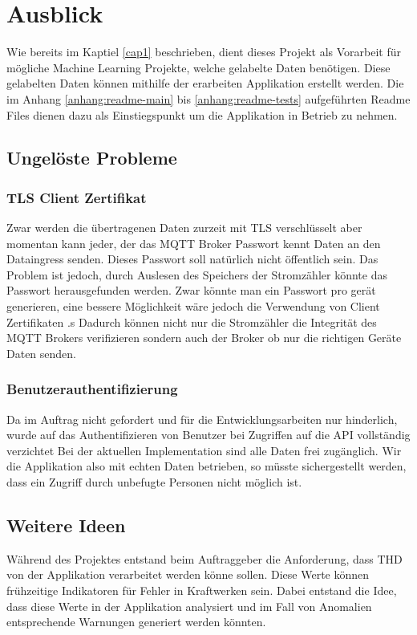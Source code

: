 \chapter{Ausblick}
Wie bereits im Kaptiel \ref{cap1} beschrieben, dient dieses Projekt als Vorarbeit für mögliche
Machine Learning Projekte, welche gelabelte Daten benötigen.
Diese gelabelten Daten können mithilfe der erarbeiten Applikation erstellt werden.
Die im Anhang \ref{anhang:readme-main} bis \ref{anhang:readme-tests} aufgeführten Readme Files dienen dazu als Einstiegspunkt
um die Applikation in Betrieb zu nehmen.



\section{Ungelöste Probleme}

\subsection{\ac{TLS} Client Zertifikat}

Zwar werden die übertragenen Daten zurzeit mit \ac{TLS} verschlüsselt aber
momentan kann jeder, der das \ac{MQTT} Broker Passwort kennt Daten an den
Dataingress senden. Dieses Passwort soll natürlich nicht öffentlich sein.
Das Problem ist jedoch, durch Auslesen des Speichers der Stromzähler
könnte das Passwort herausgefunden werden.
Zwar könnte man ein Passwort pro gerät generieren, eine bessere Möglichkeit
wäre jedoch die Verwendung von Client Zertifikaten \parencite{rfc5246_2021}.s
Dadurch können nicht nur die Stromzähler die Integrität des \ac{MQTT} Brokers
verifizieren sondern auch der Broker ob nur die richtigen Geräte
Daten senden.

\subsection{Benutzerauthentifizierung}
Da im Auftrag nicht gefordert und für die Entwicklungsarbeiten nur hinderlich,
wurde auf das Authentifizieren von Benutzer bei Zugriffen auf die \ac{API} vollständig verzichtet
Bei der aktuellen Implementation sind alle Daten frei zugänglich.
Wir die Applikation also mit echten Daten betrieben, so müsste sichergestellt werden, dass ein Zugriff durch unbefugte
Personen nicht möglich ist.



\section{Weitere Ideen}
Während des Projektes entstand beim Auftraggeber die Anforderung, dass \ac{THD} von der Applikation
verarbeitet werden könne sollen. Diese Werte können frühzeitige Indikatoren für Fehler in Kraftwerken sein.
Dabei entstand die Idee, dass diese Werte in der Applikation analysiert
und im Fall von Anomalien entsprechende Warnungen generiert werden könnten.

